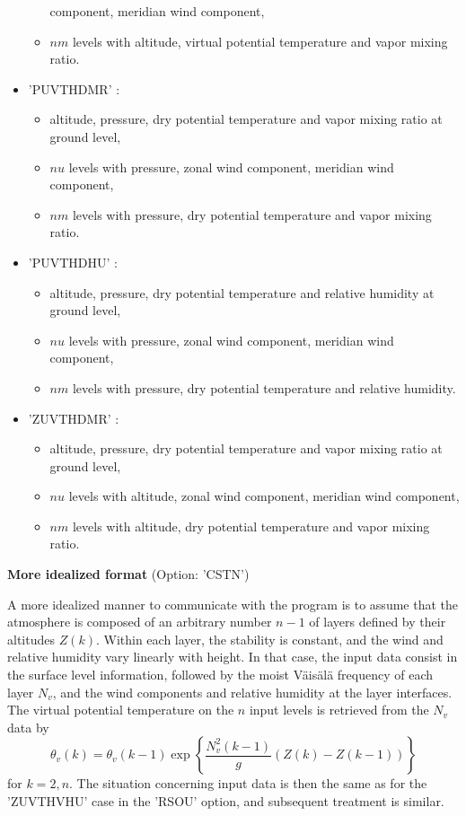 \begin{itemize}
\begin{itemize}
component, meridian wind component, \item  $nm$ levels with   altitude, virtual potential temperature
and vapor mixing ratio. \end{itemize}
\item 'PUVTHDMR'  : \begin{itemize} \item   altitude, pressure, dry potential temperature
and vapor mixing ratio at ground level, \item  $nu$ levels with pressure, zonal wind
component, meridian wind component, \item  $nm$ levels with pressure,
dry potential temperature and vapor mixing ratio.\end{itemize}
\item 'PUVTHDHU'  : \begin{itemize} \item altitude, pressure, dry potential temperature
and relative humidity at ground level, \item  $nu$ levels with pressure, zonal wind
component, meridian wind component, \item  $nm$ levels with pressure,
dry potential temperature and relative humidity.\end{itemize}
\item 'ZUVTHDMR'  : \begin{itemize} \item   altitude, pressure, dry potential temperature
and vapor mixing ratio at ground level, \item  $nu$ levels with  altitude, zonal wind
component, meridian wind component, \item  $nm$ levels with  altitude,
dry potential temperature and vapor mixing ratio.\end{itemize}
\end{itemize}

{\bf More idealized format} (Option: 'CSTN')

A more idealized manner to communicate with the program is to assume that
the atmosphere is composed of an arbitrary number $n-1$ of layers defined
by their altitudes $Z(k)$. Within each layer,
the stability is constant, and the wind and relative humidity vary linearly
with height. In that case, the input data consist in the surface level
information, followed by the moist V\"ais\"al\"a frequency of each layer
$N_v$, and the wind components and relative humidity at the layer
interfaces.
The virtual potential temperature on the $n$ input levels is retrieved
from the $N_{v}$ data by
\begin{equation}
\theta_{v}(k)  = \theta_{v}(k-1) \exp\left\{ \dfrac{N_{v}^{2}(k-1)}{g}
\left( Z(k)-Z(k-1) \right) \right\}
\end{equation}
for $k=2,n$. The situation concerning input data is then the same as for
the 'ZUVTHVHU' case in the 'RSOU' option, and subsequent treatment is similar.

